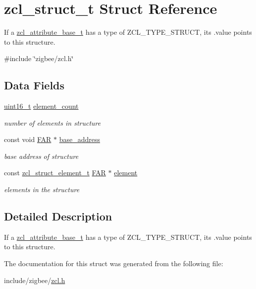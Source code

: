 \hypertarget{structzcl__struct__t}{}\section{zcl\+\_\+struct\+\_\+t Struct Reference}
\label{structzcl__struct__t}


If a \hyperlink{structzcl__attribute__base__t}{zcl\+\_\+attribute\+\_\+base\+\_\+t} has a type of Z\+C\+L\+\_\+\+T\+Y\+P\+E\+\_\+\+S\+T\+R\+U\+CT, its .value points to this structure.  




{\ttfamily \#include \char`\"{}zigbee/zcl.\+h\char`\"{}}

\subsection*{Data Fields}
\begin{DoxyCompactItemize}
\item 
\hyperlink{group__hal__dos_ga5a8b2dc9e45a9ee81a94ef304fb62505}{uint16\+\_\+t} \hyperlink{group__zcl_gadb910d838105c452018c676e15202224}{element\+\_\+count}
\begin{DoxyCompactList}\small\item\em number of elements in structure \end{DoxyCompactList}\item 
const void \hyperlink{group__hal_gaef060b3456fdcc093a7210a762d5f2ed}{F\+AR} $\ast$ \hyperlink{group__zcl_ga2c4fcaeccedd1b62207f9bb03a26fdf1}{base\+\_\+address}
\begin{DoxyCompactList}\small\item\em base address of structure \end{DoxyCompactList}\item 
const \hyperlink{structzcl__struct__element__t}{zcl\+\_\+struct\+\_\+element\+\_\+t} \hyperlink{group__hal_gaef060b3456fdcc093a7210a762d5f2ed}{F\+AR} $\ast$ \hyperlink{group__zcl_gacfb513b58d4138fe737df9448fb52e5a}{element}
\begin{DoxyCompactList}\small\item\em elements in the structure \end{DoxyCompactList}\end{DoxyCompactItemize}


\subsection{Detailed Description}
If a \hyperlink{structzcl__attribute__base__t}{zcl\+\_\+attribute\+\_\+base\+\_\+t} has a type of Z\+C\+L\+\_\+\+T\+Y\+P\+E\+\_\+\+S\+T\+R\+U\+CT, its .value points to this structure. 

The documentation for this struct was generated from the following file\+:\begin{DoxyCompactItemize}
\item 
include/zigbee/\hyperlink{zcl_8h}{zcl.\+h}\end{DoxyCompactItemize}
